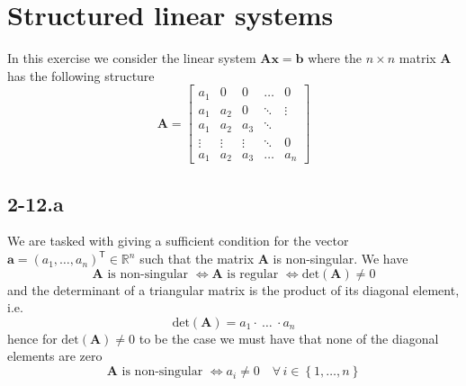 \documentclass{article}
\begin{document}
\section*{Structured linear systems}
In this exercise we consider the linear system $\mathbf{A}\mathbf{x} = \mathbf{b}$ where the $n \times n$ matrix $\mathbf{A}$ has the following structure 
\begin{equation*}
    \mathbf{A} = \begin{bmatrix}
    a_{1}& 0 & 0 & \dots & 0 \\
    a_{1} & a_{2}& 0 & \ddots & \vdots \\
    a_{1} & a_{2} & a_{3} & \ddots & \\
    \vdots & \vdots & \vdots& \ddots & 0 \\
    a_{1} & a_{2} & a_{3} & \dots & a_{n}
    \end{bmatrix}
\end{equation*}
\subsection*{2-12.a} 
We are tasked with giving a sufficient condition for the vector $\mathbf{a} = \left(a_{1}, \dots, a_{n}\right)^{\mathsf{T}} \in \mathbb{R}^{n}$ such that the matrix $\mathbf{A}$ is non-singular. We have
\begin{equation*}
    \mathbf{A} \text{ is non-singular } \Longleftrightarrow \mathbf{A} \text{ is regular } \Longleftrightarrow \text{det}\left(\mathbf{A}\right) \neq 0
\end{equation*}
and the determinant of a triangular matrix is the product of its diagonal element, i.e.
\begin{equation*}
    \text{det}\left(\mathbf{A}\right) = a_{1} \cdot \: \dots \: \cdot a_{n}
\end{equation*}
hence for $\text{det}\left(\mathbf{A}\right) \neq 0$ to be the case we must have that none of the diagonal elements are zero
\begin{equation*}
    \mathbf{A} \text{ is non-singular } \Longleftrightarrow a_{i} \neq 0 \quad \forall \, i \in \left\{1, \dots, n\right\}
\end{equation*}
\end{document}
